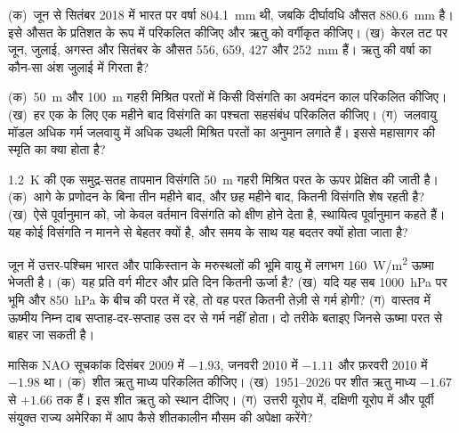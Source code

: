 \begin{exercise}[$\star$]\label{exo:b2:climate-variability:4}
(क)~जून से सितंबर 2018 में भारत पर वर्षा \qty{804.1}{mm} थी, जबकि
दीर्घावधि औसत \qty{880.6}{mm} है। इसे औसत के प्रतिशत के रूप में परिकलित कीजिए और ऋतु को
वर्गीकृत कीजिए। (ख)~केरल तट पर जून, जुलाई, अगस्त और सितंबर के औसत 556,
659, 427 और \qty{252}{mm} हैं। ऋतु की वर्षा का कौन-सा अंश जुलाई में गिरता है?
\end{exercise}

\begin{exercise}[$\star\star$]\label{exo:b2:climate-variability:5}
(क)~\qty{50}{m} और \qty{100}{m} गहरी मिश्रित परतों में किसी विसंगति का अवमंदन काल परिकलित कीजिए।
(ख)~हर एक के लिए एक महीने बाद विसंगति का पश्चता सहसंबंध परिकलित कीजिए। (ग)~जलवायु मॉडल
अधिक गर्म जलवायु में अधिक उथली मिश्रित परतों का अनुमान लगाते हैं। इससे महासागर की स्मृति का
क्या होता है?
\end{exercise}

\begin{exercise}[$\star\star$]\label{exo:b2:climate-variability:6}
\qty{+1.2}{K} की एक समुद्र-सतह तापमान विसंगति \qty{50}{m} गहरी मिश्रित परत के ऊपर
प्रेक्षित की जाती है। (क)~आगे के प्रणोदन के बिना तीन महीने बाद, और छह महीने बाद, कितनी विसंगति शेष रहती है? (ख)~ऐसे
पूर्वानुमान को, जो केवल वर्तमान विसंगति को क्षीण होने देता है, स्थायित्व पूर्वानुमान कहते हैं।
यह कोई विसंगति न मानने से बेहतर क्यों है, और समय के साथ यह बदतर क्यों होता जाता है?
\end{exercise}

\begin{exercise}[$\star\star$]\label{exo:b2:climate-variability:7}
जून में उत्तर-पश्चिम भारत और पाकिस्तान के मरुस्थलों की भूमि वायु में लगभग
\qty{160}{W/m^2} ऊष्मा भेजती है। (क)~यह प्रति वर्ग मीटर और प्रति दिन कितनी ऊर्जा है?
(ख)~यदि यह सब \qty{1000}{hPa} पर भूमि और \qty{850}{hPa} के बीच की परत में रहे, तो
वह परत कितनी तेज़ी से गर्म होगी? (ग)~वास्तव में ऊष्मीय निम्न दाब सप्ताह-दर-सप्ताह उस दर से गर्म नहीं होता।
दो तरीके बताइए जिनसे ऊष्मा परत से बाहर जा सकती है।
\end{exercise}

\begin{exercise}[$\star\star$]\label{exo:b2:climate-variability:8}
मासिक NAO सूचकांक दिसंबर 2009 में $-1.93$, जनवरी 2010 में $-1.11$ और फ़रवरी 2010 में
$-1.98$ था। (क)~शीत ऋतु माध्य परिकलित कीजिए। (ख)~1951--2026 पर शीत ऋतु माध्य
$-1.67$ से $+1.66$ तक हैं। इस शीत ऋतु को स्थान दीजिए। (ग)~उत्तरी यूरोप में, दक्षिणी यूरोप में
और पूर्वी संयुक्त राज्य अमेरिका में आप कैसे शीतकालीन मौसम की अपेक्षा करेंगे?
\end{exercise}

